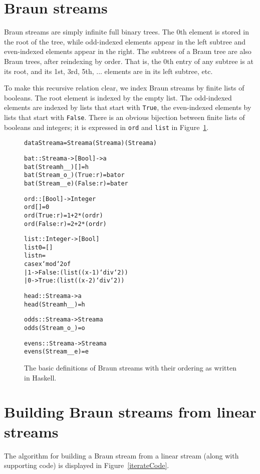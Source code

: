 \documentclass{llncs}
\begin{document}
\section{Braun streams}

Braun streams are simply infinite full binary trees.
The $0$th element is stored in the root of the tree, while odd-indexed elements appear in the left subtree and even-indexed elements appear in the right.
The subtrees of a Braun tree are also Braun trees, after reindexing by order.
That is, the 0th entry of any subtree is at its root, and its 1st, 3rd, 5th, ... elements are in its left subtree, etc.

To make this recursive relation clear, we index Braun streams by finite lists of booleans.
The root element is indexed by the empty list.
The odd-indexed elements are indexed by lists that start with \verb|True|, the even-indexed elements by lists that start with \verb|False|.
There is an obvious bijection between finite lists of booleans and integers;
it is expressed in \verb|ord| and \verb|list| in Figure~\ref{basicCode}.

\begin{figure}
\begin{alltt}
data Stream a = Stream a (Stream a) (Stream a) 

bat :: Stream a -> [Bool] -> a
bat (Stream h _ _) [] = h
bat (Stream _ o _) (True:r) = bat o r
bat (Stream _ _ e) (False:r) = bat e r

ord :: [Bool] -> Integer
ord [] = 0
ord (True:r) = 1 + 2*(ord r)
ord (False:r) = 2 + 2*(ord r)

list :: Integer -> [Bool]
list 0 = []
list n = 
    case x `mod` 2 of
      | 1 -> False:(list ((x-1)`div`2))
      | 0 -> True:(list ((x-2)`div`2))

head :: Stream a -> a
head (Stream h _ _) = h

odds :: Stream a -> Stream a
odds (Stream _ o _) = o

evens :: Stream a -> Stream a
evens (Stream _ _ e) = e
\end{alltt}
\caption{The basic definitions of Braun streams with their ordering as written in Haskell.}
\label{basicCode}
\end{figure}

\section{Building Braun streams from linear streams}

The algorithm for building a Braun stream from a linear stream (along with supporting code) is displayed in Figure~\ref{iterateCode}.
\end{document}
